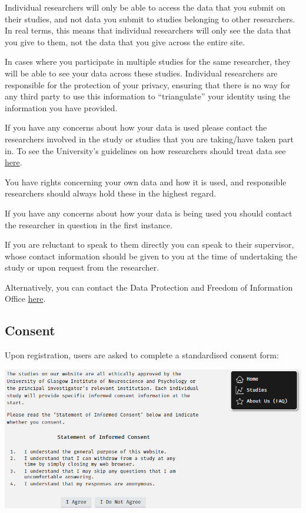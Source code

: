\documentclass[]{book}
\begin{document}
Individual researchers will only be able to access the data that you
submit on their studies, and not data you submit to studies belonging to
other researchers. In real terms, this means that individual researchers
will only see the data that you give to them, not the data that you give
across the entire site.

In cases where you participate in multiple studies for the same
researcher, they will be able to see your data across these studies.
Individual researchers are responsible for the protection of your
privacy, ensuring that there is no way for any third party to use this
information to ``triangulate'' your identity using the information you
have provided.

If you have any concerns about how your data is used please contact the
researchers involved in the study or studies that you are taking/have
taken part in. To see the University's guidelines on how researchers
should treat data see
\href{https://www.gla.ac.uk/myglasgow/dpfoioffice/}{here}.

\begin{warning}
You have rights concerning your own data and how it is used, and
responsible researchers should always hold these in the highest regard.

If you have any concerns about how your data is being used you should
contact the researcher in question in the first instance.

If you are reluctant to speak to them directly you can speak to their
supervisor, whose contact information should be given to you at the time
of undertaking the study or upon request from the researcher.

Alternatively, you can contact the Data Protection and Freedom of
Information Office
\href{https://www.gla.ac.uk/myglasgow/dpfoioffice/contact/}{here}.
\end{warning}

\subsection*{Consent}\label{consent}

Upon registration, users are asked to complete a standardised consent
form:

\includegraphics{images/screenshots/consent.png}
\end{document}

